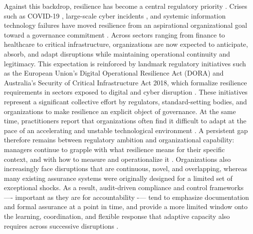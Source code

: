 Against this backdrop, resilience has become a central regulatory priority \autocite{bcbs2021operational}. Crises such as COVID-19 \autocite{almeida2020challenges}, large-scale cyber incidents \autocite{dupont2019cyberresilience}, and systemic information technology failures have moved resilience from an aspirational organizational goal toward a governance commitment \autocite{boin2013resilient}. Across sectors ranging from finance to healthcare to critical infrastructure, organizations are now expected to anticipate, absorb, and adapt disruptions while maintaining operational continuity and legitimacy. This expectation is reinforced by landmark regulatory initiatives such as the European Union's Digital Operational Resilience Act (DORA) and Australia's Security of Critical Infrastructure Act 2018, which formalize resilience requirements in sectors exposed to digital and cyber disruption \autocite{SOCI2018,european2022regulation}. These initiatives represent a significant collective effort by regulators, standard-setting bodies, and organizations to make resilience an explicit object of governance. At the same time, practitioners report that organizations often find it difficult to adapt at the pace of an accelerating and unstable technological environment \autocite{paries2017resilience}. A persistent gap therefore remains between regulatory ambition and organizational capability: managers continue to grapple with what resilience means for their specific context, and with how to measure and operationalize it \autocite{bjorck2015cyber}. Organizations also increasingly face disruptions that are continuous, novel, and overlapping, whereas many existing assurance systems were originally designed for a limited set of exceptional shocks. As a result, audit-driven compliance and control frameworks —- important as they are for accountability -— tend to emphasize documentation and formal assurance at a point in time, and provide a more limited window onto the learning, coordination, and flexible response that adaptive capacity also requires across successive disruptions \autocite{power1999audit,woods2015four}.\\

